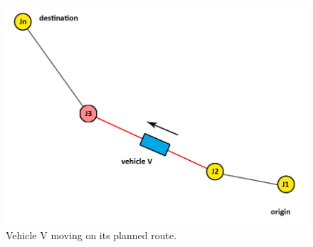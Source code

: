 \documentclass[11pt]{article}
\begin{document}
\begin{figure}[H]
\begin{center}
\includegraphics[scale=0.3]{moving_vehicles}
\caption{Vehicle V moving on its planned route.}
\end{center}
\end{figure}
\\
\end{document}
